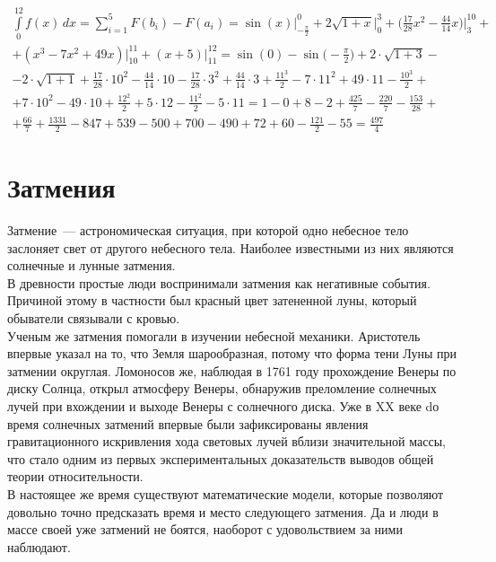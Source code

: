 \documentclass[30pt]{article}
\begin{document}
        \begin{multline}
            \int \limits_{0}^{12} f(x)\,dx = \sum \limits_{i = 1}^{5} F(b_i) - F(a_i) = \sin(x)\left. \right|_{-\frac{\pi}{2}}^{0} + 2 \sqrt{1 + x}\left. \right|_{0}^{3} + \bigg(\frac{17}{28}x^2 - \frac{44}{14}x\bigg)\left. \right|_{3}^{10} + \\
            + (x^3 - 7x ^ 2 + 49x)\left. \right|_{10}^{11} + (x + 5)\left. \right|_{11}^{12} =  \sin(0) - \sin\bigg(-\frac{\pi}{2}\bigg) + 2 \cdot \sqrt{1 + 3} - \\
            -2 \cdot \sqrt{1 + 1} + \frac{17}{28} \cdot 10^2 - \frac{44}{14} \cdot 10 - \frac{17}{28} \cdot 3^2 + \frac{44}{14} \cdot 3 + \frac{11^3}{2} - 7 \cdot 11^2 + 49 \cdot 11 - \frac{10^3}{2} + \\
            + 7 \cdot 10^2 - 49 \cdot 10 + \frac{12^2}{2} + 5 \cdot 12 - \frac{11^2}{2} - 5 \cdot 11 = 1 - 0 + 8 - 2 + \frac{425}{7} - \frac{220}{7} - \frac{153}{28} + \\
            + \frac{66}{7} + \frac{1331}{2} - 847 + 539 - 500 + 700 - 490 + 72 + 60 - \frac{121}{2} - 55 = \frac{497}{4}
            \label{eq:res}
        \end{multline}
    \section{Затмения}
        Затмение~--- астрономическая ситуация, при которой одно небесное тело заслоняет свет от другого небесного тела. Наиболее известными из них являются солнечные и лунные затмения. \\
        В древности простые люди воспринимали затмения как негативные события. Причиной этому в частности был красный цвет затененной луны, который обыватели связывали с кровью. \\
        Ученым же затмения помогали в изучении небесной механики. Аристотель впервые указал на то, что Земля шарообразная, потому что форма тени Луны при затмении округлая. Ломоносов же, наблюдая в 1761 году прохождение Венеры по диску Солнца, открыл атмосферу Венеры,  обнаружив преломление солнечных лучей при вхождении и выходе Венеры с солнечного диска. Уже в XX веке  dо время солнечных затмений впервые были зафиксированы явления гравитационного искривления хода световых лучей вблизи значительной массы, что стало одним из первых экспериментальных доказательств выводов общей теории относительности. \\
        В настоящее же время существуют математические модели, которые позволяют довольно точно предсказать время и место следующего затмения. Да и люди в массе своей уже затмений не боятся, наоборот с удовольствием за ними наблюдают. \\ 
        
\end{document}
